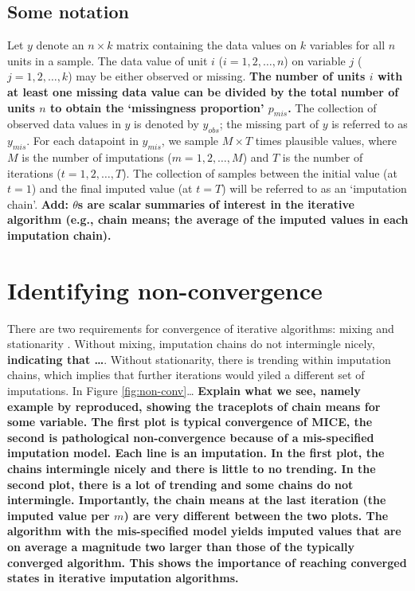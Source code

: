 \documentclass[Royal,times,sageh]{sagej}
\begin{document}
\hypertarget{some-notation}{%
\subsection{Some notation}\label{some-notation}}

Let \(y\) denote an \(n \times k\) matrix containing the data values on
\(k\) variables for all \(n\) units in a sample. The data value of unit
\(i\) (\(i = 1, 2, \dots, n\)) on variable \(j\)
(\(j = 1, 2, \dots, k\)) may be either observed or missing. \textbf{The
number of units \(i\) with at least one missing data value can be
divided by the total number of units \(n\) to obtain the `missingness
proportion' \(p_{mis}\).} The collection of observed data values in
\(y\) is denoted by \(y_{obs}\); the missing part of \(y\) is referred
to as \(y_{mis}\). For each datapoint in \(y_{mis}\), we sample
\(M \times T\) times plausible values, where \(M\) is the number of
imputations (\(m = 1, 2, \dots, M\)) and \(T\) is the number of
iterations (\(t = 1, 2, \dots, T\)). The collection of samples between
the initial value (at \(t=1\)) and the final imputed value (at \(t=T\))
will be referred to as an `imputation chain'. \textbf{Add: \(\theta\)s
are scalar summaries of interest in the iterative algorithm (e.g., chain
means; the average of the imputed values in each imputation chain). }

\hypertarget{identifying-non-convergence}{%
\section{Identifying
non-convergence}\label{identifying-non-convergence}}

There are two requirements for convergence of iterative algorithms:
mixing and stationarity \citep{gelm13}. Without mixing, imputation
chains do not intermingle nicely, \textbf{indicating that \ldots{}}.
Without stationarity, there is trending within imputation chains, which
implies that further iterations would yiled a different set of
imputations. In Figure \ref{fig:non-conv}\ldots{} \textbf{Explain what
we see, namely example by \citet{buur18} reproduced, showing the
traceplots of chain means for some variable. The first plot is typical
convergence of MICE, the second is pathological non-convergence because
of a mis-specified imputation model. Each line is an imputation. In the
first plot, the chains intermingle nicely and there is little to no
trending. In the second plot, there is a lot of trending and some chains
do not intermingle. Importantly, the chain means at the last iteration
(the imputed value per \(m\)) are very different between the two plots.
The algorithm with the mis-specified model yields imputed values that
are on average a magnitude two larger than those of the typically
converged algorithm. This shows the importance of reaching converged
states in iterative imputation algorithms.}
\end{document}
